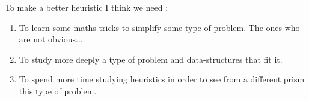 \documentclass[12pt]{article}
\begin{document}
	To make a better heuristic I think we need :
	\begin{enumerate}
		\item To learn some maths tricks to simplify some type of problem.
		\subitem The ones who are not obvious...
		\item To study more deeply a type of problem and data-structures that fit it.
		\item To spend more time studying heuristics in order to see from a different prism this type of problem.
	\end{enumerate}
		
\end{document}
